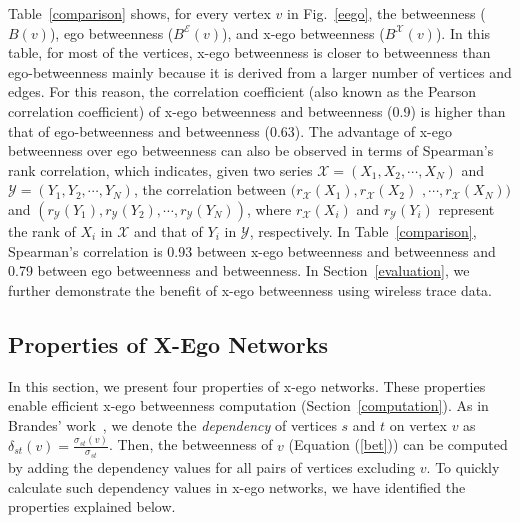 \documentclass[journal]{IEEEtran}
\newcommand{\D}[3]{\delta_{{#1}{#2}}({#3})}
\newcommand{\B}[1]{B({#1})}
\newcommand{\BE}[1]{B^{\mathcal{E}}({#1})}
\newcommand{\BX}[1]{B^{\mathcal{X}}({#1})}
\theoremstyle{definition}
\begin{document}
Table~\ref{comparison} shows, for every vertex $v$ in Fig.~\ref{eego}, the betweenness ($\B{v}$), ego betweenness ($\BE{v}$), and x-ego betweenness ($\BX{v}$).
In this table, for most of the vertices, x-ego betweenness is closer to betweenness than ego-betweenness mainly because it is derived from a larger number of vertices and edges.
For this reason, the correlation coefficient (also known as the Pearson correlation coefficient) of x-ego betweenness and betweenness (0.9) is higher than that of ego-betweenness and betweenness (0.63).
The advantage of x-ego betweenness over ego betweenness can also be observed in terms of Spearman's rank correlation, which indicates, given two series $\mathcal{X}=(X_1, X_2, \cdots, X_N)$ and $\mathcal{Y}=(Y_1, Y_2, \cdots, Y_N)$, the correlation between $(r_{\mathcal{X}}(X_1), r_{\mathcal{X}}(X_2)$ $, \cdots, r_{\mathcal{X}}(X_N))$ and $(r_{\mathcal{Y}}(Y_1), r_{\mathcal{Y}}(Y_2), \cdots, r_{\mathcal{Y}}(Y_N))$, where $r_{\mathcal{X}}(X_i)$ and $r_{\mathcal{Y}}(Y_i)$ represent the rank of $X_i$ in $\mathcal{X}$ and that of $Y_i$ in $\mathcal{Y}$, respectively.
In Table~\ref{comparison}, Spearman's correlation is 0.93 between x-ego betweenness and betweenness and 0.79 between ego betweenness and betweenness.
In Section~\ref{evaluation}, we further demonstrate the benefit of x-ego betweenness using wireless trace data.

\subsection{Properties of X-Ego Networks}\label{x-go_properties}
In this section, we present four properties of x-ego networks. 
These properties enable efficient x-ego betweenness computation (Section~\ref{computation}). 
As in Brandes' work~\cite{Brandes01afaster}, we denote the \emph{dependency} of vertices $s$ and $t$ on vertex $v$ as $\D{s}{t}{v} = \frac{\sigma_{st}(v)}{\sigma_{st}}$.
Then, the betweenness of $v$ (Equation (\ref{bet})) can be computed by adding the dependency values for all pairs of vertices excluding $v$.
To quickly calculate such dependency values in x-ego networks, we have identified the properties explained below. 
\end{document}
